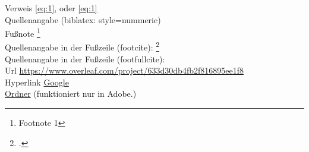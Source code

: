 Verweis \ref{eq:1}, oder \autoref{eq:1}\\
Quellenangabe \cite{citation-example} (biblatex: style=nummeric)\\ 
Fußnote \footnote{Footnote 1}\\
Quellenangabe in der Fußzeile (footcite): \footcite{citation-example}\\
Quellenangabe in der Fußzeile (footfullcite): \\
Url \url{https://www.overleaf.com/project/633d30db4fb2f816895ee1f8}\\
Hyperlink \href{https://www.google.com/}{Google}\\
\href{run:C:/Users/jonathan.mayer/Studium/01_Wintersemester_22_23/01_MM_Mathematische_Methoden der Physik/313.208_Vorlesung/MathMeth_gesamt.pdf}{Ordner} (funktioniert nur in Adobe.)\\